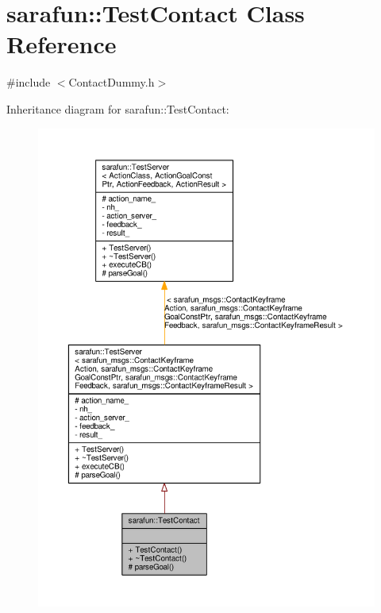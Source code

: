 \hypertarget{classsarafun_1_1TestContact}{\section{sarafun\-:\-:Test\-Contact Class Reference}
\label{classsarafun_1_1TestContact}
}


{\ttfamily \#include $<$Contact\-Dummy.\-h$>$}



Inheritance diagram for sarafun\-:\-:Test\-Contact\-:
\nopagebreak
\begin{figure}[H]
\begin{center}
\leavevmode
\includegraphics[width=350pt]{d0/d79/classsarafun_1_1TestContact__inherit__graph}
\end{center}
\end{figure}


